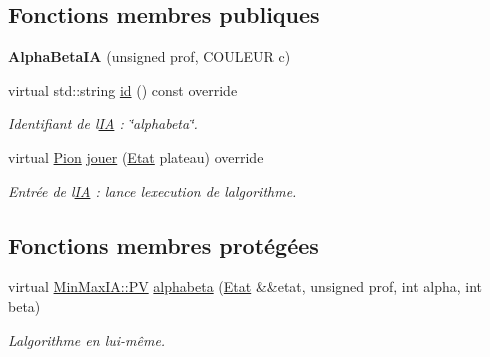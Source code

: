 \subsection*{Fonctions membres publiques}
\begin{DoxyCompactItemize}
\item 
{\bfseries Alpha\+Beta\+IA} (unsigned prof, C\+O\+U\+L\+E\+UR c)\hypertarget{classAlphaBetaIA_affceed21fffddfe4768ce7266810e911}{}\label{classAlphaBetaIA_affceed21fffddfe4768ce7266810e911}

\item 
virtual std\+::string \hyperlink{classAlphaBetaIA_acdf19af08e9d5c2f3fc59015e5eebf9f}{id} () const override\hypertarget{classAlphaBetaIA_acdf19af08e9d5c2f3fc59015e5eebf9f}{}\label{classAlphaBetaIA_acdf19af08e9d5c2f3fc59015e5eebf9f}

\begin{DoxyCompactList}\small\item\em Identifiant de l\textquotesingle{}\hyperlink{classIA}{IA} \+: \char`\"{}alphabeta\char`\"{}. \end{DoxyCompactList}\item 
virtual \hyperlink{structPion}{Pion} \hyperlink{classAlphaBetaIA_a33c975e65d1bec468c179972ecb1062c}{jouer} (\hyperlink{structEtat}{Etat} plateau) override\hypertarget{classAlphaBetaIA_a33c975e65d1bec468c179972ecb1062c}{}\label{classAlphaBetaIA_a33c975e65d1bec468c179972ecb1062c}

\begin{DoxyCompactList}\small\item\em Entrée de l\textquotesingle{}\hyperlink{classIA}{IA} \+: lance l\textquotesingle{}execution de l\textquotesingle{}algorithme. \end{DoxyCompactList}\end{DoxyCompactItemize}
\subsection*{Fonctions membres protégées}
\begin{DoxyCompactItemize}
\item 
virtual \hyperlink{structIA_1_1PV}{Min\+Max\+I\+A\+::\+PV} \hyperlink{classAlphaBetaIA_a864176d2e17750808299a6850f1396c3}{alphabeta} (\hyperlink{structEtat}{Etat} \&\&etat, unsigned prof, int alpha, int beta)\hypertarget{classAlphaBetaIA_a864176d2e17750808299a6850f1396c3}{}\label{classAlphaBetaIA_a864176d2e17750808299a6850f1396c3}

\begin{DoxyCompactList}\small\item\em L\textquotesingle{}algorithme en lui-\/même. \end{DoxyCompactList}\end{DoxyCompactItemize}
